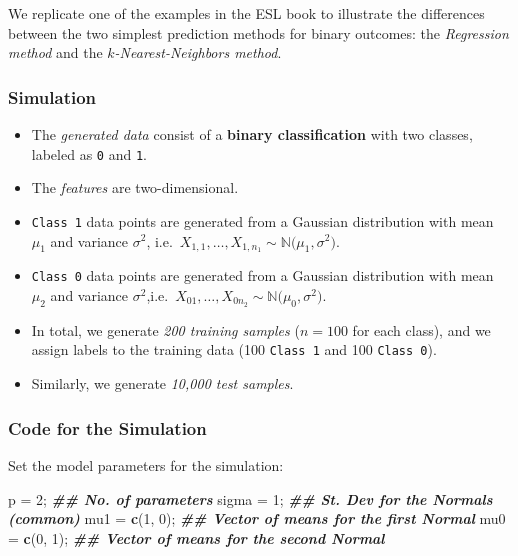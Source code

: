 \documentclass[
]{book}
\newenvironment{Shaded}{\begin{snugshade}}{\end{snugshade}}
\newcommand{\DecValTok}[1]{\textcolor[rgb]{0.00,0.00,0.81}{#1}}
\newcommand{\DocumentationTok}[1]{\textcolor[rgb]{0.56,0.35,0.01}{\textbf{\textit{#1}}}}
\newcommand{\FunctionTok}[1]{\textcolor[rgb]{0.13,0.29,0.53}{\textbf{#1}}}
\newcommand{\NormalTok}[1]{#1}
\newcommand{\OtherTok}[1]{\textcolor[rgb]{0.56,0.35,0.01}{#1}}
\providecommand{\tightlist}{%
  \setlength{\itemsep}{0pt}\setlength{\parskip}{0pt}}
\begin{document}
We replicate one of the examples in the ESL book to illustrate the differences between the two simplest prediction methods for binary outcomes: the \emph{Regression method} and the \emph{\(k\)-Nearest-Neighbors method}.

\subsubsection{Simulation}\label{simulation}

\begin{itemize}
\tightlist
\item
  The \emph{generated data} consist of a \textbf{binary classification} with two classes, labeled as \texttt{0} and \texttt{1}.
\item
  The \emph{features} are two-dimensional.
\item
  \texttt{Class\ 1} data points are generated from a Gaussian distribution with mean \(\mu_1\) and variance \(\sigma^2\), i.e.~\(X_{1,1}, \ldots, X_{1,n_1} \sim \mathbb{N}\bigl( \mu_1, \sigma^2 \bigr)\).
\item
  \texttt{Class\ 0} data points are generated from a Gaussian distribution with mean \(\mu_2\) and variance \(\sigma^2\),i.e.~\(X_{01}, \ldots, X_{0n_2} \sim \mathbb{N}\bigl( \mu_0, \sigma^2 \bigr)\).
\item
  In total, we generate \emph{200 training samples} (\(n=100\) for each class), and we assign labels to the training data (100 \texttt{Class\ 1} and 100 \texttt{Class\ 0}).
\item
  Similarly, we generate \emph{10,000 test samples}.
\end{itemize}

\subsubsection{Code for the Simulation}\label{code-for-the-simulation}

Set the model parameters for the simulation:

\begin{Shaded}
\begin{Highlighting}[]
\NormalTok{p }\OtherTok{=} \DecValTok{2}\NormalTok{;           }\DocumentationTok{\#\# No. of parameters}
\NormalTok{sigma }\OtherTok{=} \DecValTok{1}\NormalTok{;       }\DocumentationTok{\#\# St. Dev for the Normals (common)}
\NormalTok{mu1 }\OtherTok{=} \FunctionTok{c}\NormalTok{(}\DecValTok{1}\NormalTok{, }\DecValTok{0}\NormalTok{);   }\DocumentationTok{\#\# Vector of means for the first Normal}
\NormalTok{mu0 }\OtherTok{=} \FunctionTok{c}\NormalTok{(}\DecValTok{0}\NormalTok{, }\DecValTok{1}\NormalTok{);   }\DocumentationTok{\#\# Vector of means for the second Normal}
\end{Highlighting}
\end{Shaded}
\end{document}
